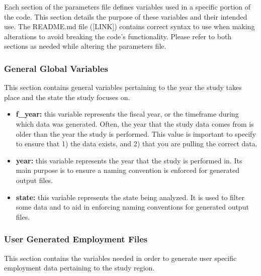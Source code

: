 \documentclass[
]{book}
\providecommand{\tightlist}{%
  \setlength{\itemsep}{0pt}\setlength{\parskip}{0pt}}
\begin{document}
Each section of the parameters file defines variables used in a specific portion of the code. This section details the purpose of these variables and their intended use. The README.md file ({[}LINK{]}) contains correct syntax to use when making alterations to avoid breaking the code's functionality. Please refer to both sections as needed while altering the parameters file.

\hypertarget{global}{%
\subsubsection{General Global Variables}\label{global}}

This section contains general variables pertaining to the year the study takes place and the state the study focuses on.

\begin{itemize}
\tightlist
\item
  \textbf{f\_year:} this variable represents the fiscal year, or the timeframe during which data was generated. Often, the year that the study data comes from is older than the year the study is performed. This value is important to specify to ensure that 1) the data exists, and 2) that you are pulling the correct data.\\
\item
  \textbf{year:} this variable represents the year that the study is performed in. Its main purpose is to ensure a naming convention is enforced for generated output files.
\item
  \textbf{state:} this variable represents the state being analyzed. It is used to filter some data and to aid in enforcing naming conventions for generated output files.
\end{itemize}

\hypertarget{generated-employ}{%
\subsubsection{User Generated Employment Files}\label{generated-employ}}

This section contains the variables needed in order to generate user specific employment data pertaining to the study region.
\end{document}
